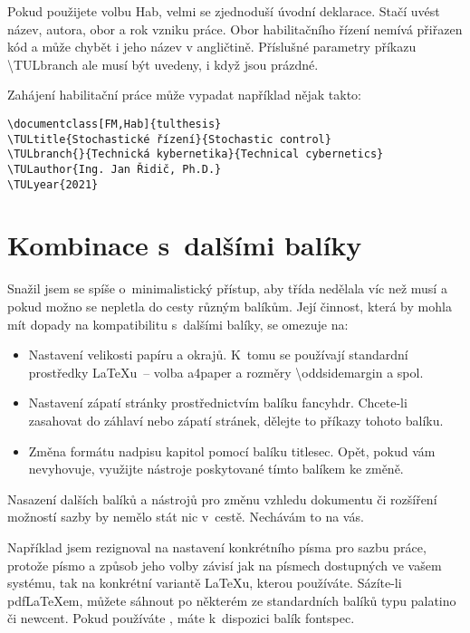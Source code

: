 \documentclass[FF,fonts]{tulthesis}
\makeatletter
\newcommand{\argument}[1]{{\ttfamily\color{\tulcolor}#1}}
\newcommand{\argumentindex}[1]{\argument{#1}\index{#1}}
\newcommand{\prikazneindex}[1]{\argument{\textbackslash #1}}
\newcommand{\prikaz}[1]{\prikazneindex{#1}\index{#1@\textbackslash #1}}
\newenvironment{myquote}{\begin{list}{}{\setlength\leftmargin\parindent}\item[]}{\end{list}}
\newenvironment{listing}{\begin{myquote}\color{\tulcolor}}{\end{myquote}}
\makeatother
\begin{document}
Pokud použijete volbu \argumentindex{Hab}, velmi se zjednoduší úvodní
deklarace. Stačí uvést název, autora, obor a rok vzniku práce. Obor
habilitačního řízení nemívá přiřazen kód a může chybět i jeho název v
angličtině. Příslušné parametry příkazu \prikaz{TULbranch} ale musí být
uvedeny, i když jsou prázdné.

Zahájení habilitační práce může vypadat například nějak takto:

\begin{listing}
\begin{verbatim}
\documentclass[FM,Hab]{tulthesis}
\TULtitle{Stochastické řízení}{Stochastic control}
\TULbranch{}{Technická kybernetika}{Technical cybernetics}
\TULauthor{Ing. Jan Řidič, Ph.D.}
\TULyear{2021}
\end{verbatim}
\end{listing}


\section{Kombinace s~dalšími balíky}

Snažil jsem se spíše o~minimalistický přístup, aby třída nedělala víc než musí
a pokud možno se nepletla do cesty různým balíkům. Její činnost, která by
mohla mít dopady na kompatibilitu s~dalšími balíky, se omezuje na:

\begin{itemize}
\item Nastavení velikosti papíru a okrajů. K~tomu se používají standardní
prostředky \LaTeX u~-- volba \argument{a4paper} a rozměry
\prikazneindex{oddsidemargin} a spol.

\item Nastavení zápatí stránky prostřednictvím balíku \argument{fancyhdr}.
Chcete-li zasahovat do záhlaví nebo zápatí stránek, dělejte to příkazy tohoto
balíku.

\item Změna formátu nadpisu kapitol pomocí balíku \argument{titlesec}. Opět,
pokud vám nevyhovuje, využijte nástroje poskytované tímto balíkem ke změně.

\end{itemize}

Nasazení dalších balíků a nástrojů pro změnu vzhledu dokumentu či rozšíření
možností sazby by nemělo stát nic v~cestě. Nechávám to na vás.

Například jsem rezignoval na nastavení konkrétního písma pro sazbu práce,
protože písmo a způsob jeho volby závisí jak na písmech dostupných ve vašem
systému, tak na konkrétní variantě \LaTeX u, kterou používáte. Sázíte-li
pdf\-\LaTeX\-em, můžete sáhnout po některém ze standardních balíků typu
\argument{palatino} či \argument{newcent}. Pokud používáte \XeLaTeX, máte
k~dispozici balík \argument{fontspec}.
\end{document}
